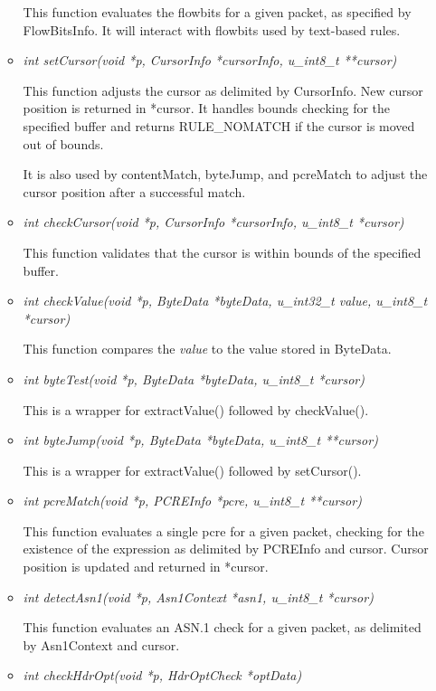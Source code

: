 \documentclass[english]{report}
\begin{document}
\begin{itemize}
\begin{itemize}
This function evaluates the flowbits for a given packet, as specified by
FlowBitsInfo.  It will interact with flowbits used by text-based rules.

\item {\em int setCursor(void *p, CursorInfo *cursorInfo, u\_int8\_t **cursor)}

This function adjusts the cursor as delimited by CursorInfo.  New cursor
position is returned in *cursor.  It handles bounds checking for the specified
buffer and returns RULE\_NOMATCH if the cursor is moved out of bounds.  

It is also used by contentMatch, byteJump, and pcreMatch to adjust the cursor
position after a successful match.

\item {\em int checkCursor(void *p, CursorInfo *cursorInfo, u\_int8\_t *cursor)}

This function validates that the cursor is within bounds of the specified
buffer.

\item {\em int checkValue(void *p, ByteData *byteData, u\_int32\_t value, u\_int8\_t *cursor)}

This function compares the {\em value} to the value stored in ByteData.

\item {\em int byteTest(void *p, ByteData *byteData, u\_int8\_t *cursor)}

This is a wrapper for extractValue() followed by checkValue().

\item {\em int byteJump(void *p, ByteData *byteData, u\_int8\_t **cursor)}

This is a wrapper for extractValue() followed by setCursor().

\item {\em int pcreMatch(void *p, PCREInfo *pcre, u\_int8\_t **cursor)}

This function evaluates a single pcre for a given packet, checking for the
existence of the expression as delimited by PCREInfo and cursor.  Cursor
position is updated and returned in *cursor.

\item {\em int detectAsn1(void *p, Asn1Context *asn1, u\_int8\_t *cursor)}

This function evaluates an ASN.1 check for a given packet, as delimited by
Asn1Context and cursor.

\item {\em int checkHdrOpt(void *p, HdrOptCheck *optData)}


\end{itemize}
\end{itemize}
\end{document}
